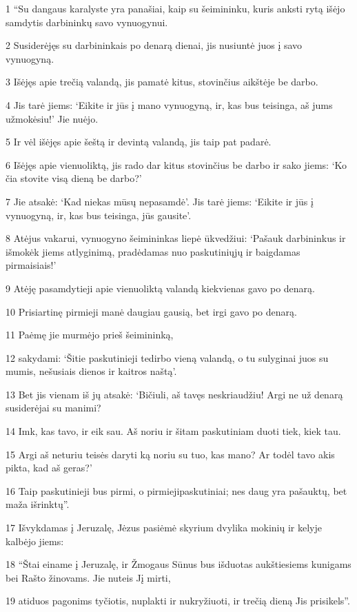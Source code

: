 \par 1 “Su dangaus karalyste yra panašiai, kaip su šeimininku, kuris anksti rytą išėjo samdytis darbininkų savo vynuogynui. 
\par 2 Susiderėjęs su darbininkais po denarą dienai, jis nusiuntė juos į savo vynuogyną. 
\par 3 Išėjęs apie trečią valandą, jis pamatė kitus, stovinčius aikštėje be darbo. 
\par 4 Jis tarė jiems: ‘Eikite ir jūs į mano vynuogyną, ir, kas bus teisinga, aš jums užmokėsiu!’ Jie nuėjo. 
\par 5 Ir vėl išėjęs apie šeštą ir devintą valandą, jis taip pat padarė. 
\par 6 Išėjęs apie vienuoliktą, jis rado dar kitus stovinčius be darbo ir sako jiems: ‘Ko čia stovite visą dieną be darbo?’ 
\par 7 Jie atsakė: ‘Kad niekas mūsų nepasamdė’. Jis tarė jiems: ‘Eikite ir jūs į vynuogyną, ir, kas bus teisinga, jūs gausite’. 
\par 8 Atėjus vakarui, vynuogyno šeimininkas liepė ūkvedžiui: ‘Pašauk darbininkus ir išmokėk jiems atlyginimą, pradėdamas nuo paskutiniųjų ir baigdamas pirmaisiais!’ 
\par 9 Atėję pasamdytieji apie vienuoliktą valandą kiekvienas gavo po denarą. 
\par 10 Prisiartinę pirmieji manė daugiau gausią, bet irgi gavo po denarą. 
\par 11 Paėmę jie murmėjo prieš šeimininką, 
\par 12 sakydami: ‘Šitie paskutinieji tedirbo vieną valandą, o tu sulyginai juos su mumis, nešusiais dienos ir kaitros naštą’. 
\par 13 Bet jis vienam iš jų atsakė: ‘Bičiuli, aš tavęs neskriaudžiu! Argi ne už denarą susiderėjai su manimi? 
\par 14 Imk, kas tavo, ir eik sau. Aš noriu ir šitam paskutiniam duoti tiek, kiek tau. 
\par 15 Argi aš neturiu teisės daryti ką noriu su tuo, kas mano? Ar todėl tavo akis pikta, kad aš geras?’ 
\par 16 Taip paskutinieji bus pirmi, o pirmieji­paskutiniai; nes daug yra pašauktų, bet maža išrinktų”. 
\par 17 Išvykdamas į Jeruzalę, Jėzus pasiėmė skyrium dvylika mokinių ir kelyje kalbėjo jiems: 
\par 18 “Štai einame į Jeruzalę, ir Žmogaus Sūnus bus išduotas aukštiesiems kunigams bei Rašto žinovams. Jie nuteis Jį mirti, 
\par 19 atiduos pagonims tyčiotis, nuplakti ir nukryžiuoti, ir trečią dieną Jis prisikels”. 
